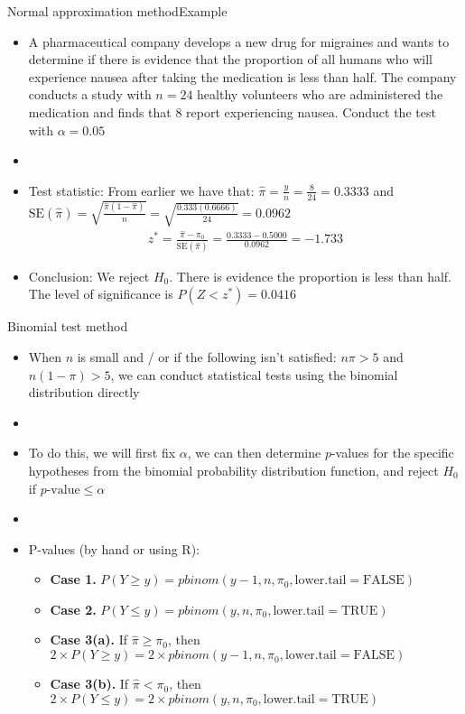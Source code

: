\documentclass[xcolor=dvipsnames]{beamer}
\begin{document}
\begin{frame}{Normal approximation method}{Example}
	\begin{itemize}
		\item A pharmaceutical company develops a new drug for migraines and wants to determine if there is evidence that the proportion of all humans who will experience nausea after taking the medication is less than half. The company conducts a study with $n = 24$ healthy volunteers who are administered the medication and finds that 8 report experiencing nausea. Conduct the test with $\alpha = 0.05$
		\item[]
		\item Test statistic: From earlier we have that: $\hat{\pi} = \frac{y}{n} = \frac{8}{24} = 0.3333$ and $		\text{SE}(\hat{\pi})=\sqrt{\frac{\hat{\pi}(1-\hat{\pi})}{n}} = \sqrt{\frac{0.333(0.6666)}{24}} = 0.0962$
			\begin{gather*}
				z^* = \frac{\hat{\pi}-\pi_0}{\text{SE}(\hat{\pi})} = \frac{0.3333-0.5000}{0.0962} =-1.733
			\end{gather*}
		\item Conclusion: We reject $H_0$. There is evidence the proportion is less than half. The level of significance is $P(Z < z^*) = 0.0416$
	\end{itemize}
\end{frame}

\begin{frame}{Binomial test method}
	\begin{itemize}
		\item When $n$ is small and / or if the following isn't satisfied: $n \pi > 5$ and $n(1-\pi) > 5$, we can conduct statistical tests using the binomial distribution directly 
		\item[]
		\item To do this, we will first fix $\alpha$, we can then determine $p$-values for the specific hypotheses from the binomial probability distribution function, and reject $H_0$ if $p\text{-value} \leq \alpha$
		\item[]
		\item P-values (by hand or using R):
		\begin{itemize}
			\item \textbf{Case 1.} $P(Y \geq y) = pbinom(y - 1, n, \pi_0, \text{lower.tail} = \text{FALSE})$
			\item \textbf{Case 2.} $P(Y \leq y) = pbinom(y, n, \pi_0, \text{lower.tail} = \text{TRUE})$
			\item \textbf{Case 3(a).} If $\hat{\pi}\geq \pi_0$, then $2\times P(Y \geq y) = 2 \times pbinom(y - 1, n, \pi_0, \text{lower.tail} = \text{FALSE})$
			\item \textbf{Case 3(b).} If $\hat{\pi}< \pi_0$, then $2 \times P(Y \leq y) = 2 \times pbinom(y, n, \pi_0, \text{lower.tail} = \text{TRUE})$
		\end{itemize}
	\end{itemize}
\end{frame}
\end{document}

